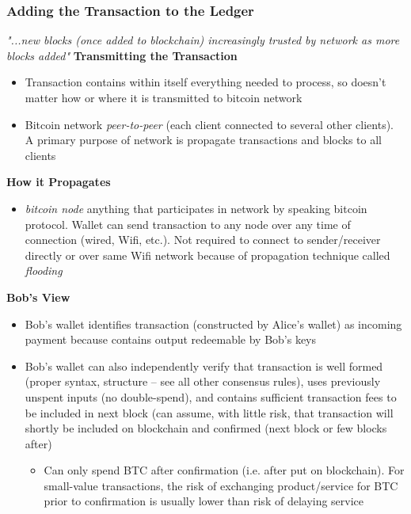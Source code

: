 \documentclass[english, 11pt]{article}
\begin{document}
\subsubsection{Adding the Transaction to the Ledger}
\textit{"...new blocks (once added to blockchain) increasingly trusted by network as more blocks added"}
\break
\break
\textbf{Transmitting the Transaction}
\begin{itemize}
    \item Transaction contains within itself everything needed to process, so doesn't matter how or where it is transmitted to bitcoin network
    \item Bitcoin network \textit{peer-to-peer} (each client connected to several other clients). A primary purpose of network is  propagate transactions and blocks to all clients
\end{itemize}
\noident\textbf{How it Propagates}
\begin{itemize}
    \item \textit{bitcoin node} anything that participates in network by speaking bitcoin protocol. Wallet can send transaction to any node over any time of connection (wired, Wifi, etc.). Not required to connect to sender/receiver directly or over same Wifi network because of propagation technique called \textit{flooding}
\end{itemize}

\noindent\textbf{Bob's View}
\begin{itemize}
    \item Bob's wallet identifies transaction (constructed by Alice's wallet) as incoming payment because contains output redeemable by Bob's keys
    \item Bob's wallet can also independently verify that transaction is well formed (proper syntax, structure -- see all other consensus rules), uses previously unspent inputs (no double-spend), and contains sufficient transaction fees to be included in next block (can assume, with little risk, that transaction will shortly be included on blockchain and confirmed (next block or few blocks after)
    \begin{itemize}
        \item Can only spend BTC after confirmation (i.e. after put on blockchain). For small-value transactions, the risk of exchanging product/service for BTC prior to confirmation is usually lower than risk of delaying service
    \end{itemize}
\end{itemize}
\end{document}
